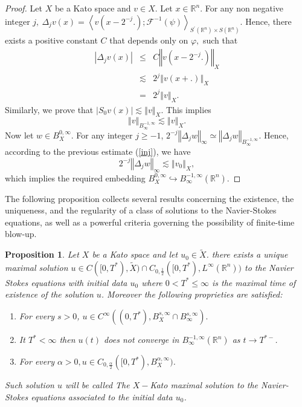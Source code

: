 \documentclass[11pt]{amsart}%
\theoremstyle{plain}
\numberwithin{equation}{section}
\newtheorem{proposition}{Proposition}[section]
\begin{document}
\begin{proof}
Let $X$ be a Kato space and $v\in X.$ Let $x\in \mathbb{R}^{n}.$ For any
non negative integer $j,~\Delta _{j}v(x)=\left\langle v(x-2^{-j}.);%
\mathcal{F}^{-1}(\psi )\right\rangle _{S^{\prime }(\mathbb{R}^{n})\times
S(\mathbb{R}^{n})}.$ Hence, there exists a positive constant $C$ that
depends only on $\varphi ,$ such that
\begin{eqnarray*}
\left\vert \Delta _{j}v(x)\right\vert &\leq &C\left\Vert
v(x-2^{-j}.)\right\Vert _{X} \\
& \lesssim& 2^{j}\left\Vert v(x+.)\right\Vert _{X} \\
&=&2^{j}\left\Vert v\right\Vert _{X}.
\end{eqnarray*}%
Similarly, we prove that $\left\vert S_{0}v(x)\right\vert \lesssim
\left\Vert v\right\Vert _{X}.$ This implies
\begin{equation}\label{inj}
\left\Vert
v\right\Vert _{B_{\infty }^{-1,\infty }}\lesssim \left\Vert
v\right\Vert _{X}.
\end{equation}
Now let $w\in B^{0,\infty}_X$. For any integer $j\geq -1$, $2^{-j}\left\Vert\Delta_j w\right\Vert_\infty\simeq \left\Vert\Delta_j w\right\Vert_{B_{\infty }^{-1,\infty }}$. Hence, according to the previous estimate (\ref{inj}), we have
$$2^{-j}\left\Vert\Delta_j w\right\Vert_\infty\lesssim \left\Vert
v_{0}\right\Vert _{X},$$
which implies the required embedding $B^{0,\infty}_X\hookrightarrow B_{\infty }^{-1,\infty }(\mathbb{R}^{n}).$
\end{proof}
The following proposition collects several results concerning the existence, the uniqueness, and the regularity of a class of solutions to the Navier-Stokes equations, as well as a powerful criteria governing the possibility of finite-time blow-up.
\begin{proposition}\label{Ram}
Let $X$ be a Kato space and let $u_0\in\tilde{X}$. there exists a unique maximal solution $u\in C([0,T^\ast),\tilde{X})\cap C_{0,\frac{1}{2}}([0,T^\ast),L^\infty(\mathbb{R}^n))$ to the Navier Stokes equations with initial data $u_0$ where $0<T^\ast\leq \infty$ is the maximal time of existence of the solution $u$. Moreover the following proprieties are satisfied:
\begin{enumerate}
    \item For every $s>0$, $u\in C^\infty((0,T^\ast),B^{s,\infty}_X\cap B^{s,\infty}_\infty).$
    \item It $T^\ast< \infty$ then $u(t)$ does not converge in $B^{-1,\infty}_\infty(\mathbb{R}^n)$ as $t\to T^{\ast -}$.
    \item For every $\alpha>0, u\in C_{0,\frac{\alpha}{2}}([0,T^\ast),B^{\alpha,\infty}_X)$.
\end{enumerate}
Such solution $u$ will be called The $X-$Kato maximal solution to the Navier-Stokes equations associated to the initial data $u_0$.
\end{proposition}
\end{document}
